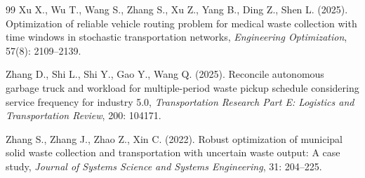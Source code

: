\documentclass[preprint,11pt,authoryear]{elsarticle}
\begin{document}
\begin{thebibliography}{99}
Xu X., Wu T., Wang S., Zhang S., Xu Z., Yang B., Ding Z., Shen L. (2025). Optimization of reliable vehicle routing problem for medical waste collection with time windows in stochastic transportation networks,
\textit{Engineering Optimization}, 57(8): 2109--2139.

Zhang D., Shi L.,  Shi Y., Gao Y., Wang Q. (2025). Reconcile autonomous garbage truck and workload for multiple-period waste pickup schedule considering service frequency for industry 5.0, \textit{Transportation Research Part E: Logistics and Transportation Review}, 200: 104171.

Zhang S., Zhang J., Zhao Z., Xin C. (2022). Robust optimization of municipal solid waste collection and transportation with uncertain waste output: A case study, \textit{Journal of Systems Science and Systems Engineering}, 31: 204--225.

\end{thebibliography}
\end{document}
